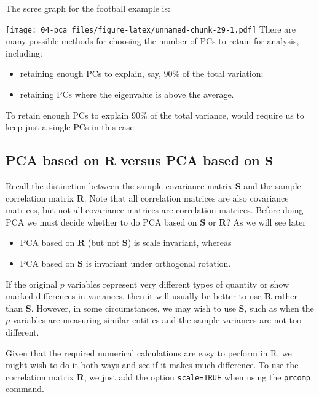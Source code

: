 \documentclass[]{book}
\providecommand{\tightlist}{%
  \setlength{\itemsep}{0pt}\setlength{\parskip}{0pt}}
\theoremstyle{definition}
\theoremstyle{definition}
\theoremstyle{definition}
\theoremstyle{remark}
\begin{document}
The scree graph for the football example is:

\texttt{[image: 04-pca\_files/figure-latex/unnamed-chunk-29-1.pdf]}
There are many possible methods for choosing the number of PCs to retain for analysis, including:

\begin{itemize}
\tightlist
\item
  retaining enough PCs to explain, say, 90\% of the total variation;
\item
  retaining PCs where the eigenvalue is above the average.
\end{itemize}

To retain enough PCs to explain 90\% of the total variance, would require us to keep just a single PCs in this case.

\hypertarget{pcawithR}{%
\subsection{\texorpdfstring{PCA based on \(\mathbf R\) versus PCA based on \(\mathbf S\)}{PCA based on \textbackslash{}mathbf R versus PCA based on \textbackslash{}mathbf S}}\label{pcawithR}}

Recall the distinction between the sample covariance matrix \(\mathbf S\) and the sample correlation matrix \(\mathbf R\).
Note that all correlation matrices are also covariance matrices, but not all covariance matrices are correlation matrices.
Before doing PCA we must decide whether to do PCA based on \(\mathbf S\) or \(\mathbf R\)? As we will see later

\begin{itemize}
\tightlist
\item
  PCA based on \(\mathbf R\) (but not \(\mathbf S\)) is scale invariant, whereas
\item
  PCA based on \(\mathbf S\) is invariant under orthogonal rotation.
\end{itemize}

If the original \(p\) variables represent very different types of quantity or show marked differences in variances, then it will usually be better to use \(\mathbf R\) rather than \(\mathbf S\). However, in some circumstances, we may wish to use \(\mathbf S\), such as when the \(p\) variables are measuring similar entities and the sample variances are not too different.

Given that the required numerical calculations are easy to perform in R, we might wish to do it both ways and see if it makes much difference. To use the correlation matrix \(\mathbf R\), we just add the option \texttt{scale=TRUE} when using the \texttt{prcomp} command.
\end{document}
